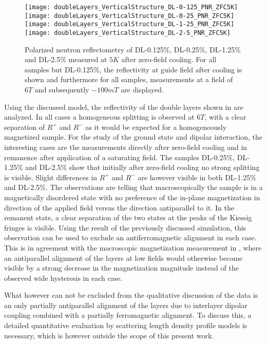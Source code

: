 \documentclass[\main/dresen_thesis.tex]{subfiles}
\begin{document}
  \begin{figure}[tb]
    \centering
    \texttt{[image: doubleLayers\_VerticalStructure\_DL-0-125\_PNR\_ZFC5K]}
    \texttt{[image: doubleLayers\_VerticalStructure\_DL-0-25\_PNR\_ZFC5K]}
    \texttt{[image: doubleLayers\_VerticalStructure\_DL-1-25\_PNR\_ZFC5K]}
    \texttt{[image: doubleLayers\_VerticalStructure\_DL-2-5\_PNR\_ZFC5K]}
    \caption{\label{fig:doubleLayers:pnrData}Polarized neutron reflectometry of DL-0.125\%, DL-0.25\%, DL-1.25\% and DL-2.5\% measured at $5 \unit{K}$ after zero-field cooling. For all samples but DL-0.125\%, the reflectivity at guide field after cooling is shown and furthermore for all samples, measurements at a field of $6 \unit{T}$ and subsequently $-100 \unit{mT}$ are displayed.}
  \end{figure}
  Using the discussed model, the reflectivity of the double layers shown in  are analyzed.
  In all cases a homogeneous splitting is observed at $6 \unit{T}$, with a clear separation of $R^{+}$ and $R^{-}$ as it would be expected for a homogeneously magnetized sample.
  For the study of the ground state and dipolar interaction, the interesting cases are the measurements directly after zero-field cooling and in remanence after application of a saturating field.
  The samples DL-0.25\%, DL-1.25\% and DL-2.5\% show that initially after zero-field cooling no strong splitting is visible.
  Slight differences in $R^{+}$ and $R^{-}$ are however visible in both DL-1.25\% and DL-2.5\%.
  The observations are telling that macroscopically the sample is in a magnetically disordered state with no preference of the in-plane magnetization in direction of the applied field versus the direction antiparallel to it.
  In the remanent state, a clear separation of the two states at the peaks of the Kiessig fringes is visible.
  Using the result of the previously discussed simulation, this observation can be used to exclude an antiferromagnetic alignment in each case.
  This is in agreement with the macroscopic magnetization measurement in , where an antiparallel alignment of the layers at low fields would otherwise become visible by a strong decrease in the magnetization magnitude instead of the observed wide hysteresis in each case.

  What however can not be excluded from the qualitative discussion of the data is an only partially antiparallel alignment of the layers due to interlayer dipolar coupling combined with a partially ferromagnetic alignment.
  To discuss this, a detailed quantitative evaluation by scattering length density profile models is necessary, which is however outside the scope of this present work.
\end{document}
